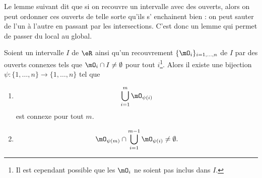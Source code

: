 Le lemme suivant dit que si on recouvre un intervalle avec des ouverts, alors on peut ordonner ces ouverts de telle sorte qu'ils s' enchainent bien : on peut sauter de l'un à l'autre en passant par les intersections. C'est donc un lemme qui permet de passer du local au global.

\begin{lemma}       \label{LEMooNMGWooTfQDeO}
    Soient un intervalle \( I\) de \( \eR\) ainsi qu'un recouvrement \( \{ \mO_i \}_{i=1,\ldots, n}\) de \( I\) par des ouverts connexes tels que \( \mO_i\cap I\neq\emptyset\) pour tout \( i\)\footnote{Il est cependant possible que les \( \mO_i\) ne soient pas inclus dans \( I\).}. Alors il existe une bijection \( \psi\colon \{ 1,\ldots, n \}\to \{ 1,\ldots, n \}\) tel que
    \begin{enumerate}
        \item
    \begin{equation}
        \bigcup_{i=1}^m\mO_{\psi(i)}
    \end{equation}
    est connexe pour tout \( m\).
\item
    \begin{equation}
        \mO_{\psi(m)}\cap\bigcup_{i=1}^{m-1}\mO_{\psi(i)}\neq \emptyset.
    \end{equation}
    \end{enumerate}
\end{lemma}

